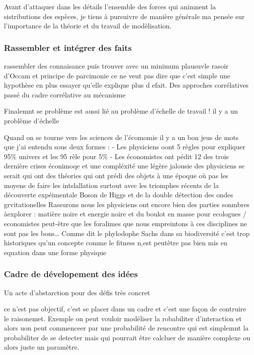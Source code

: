 Avant d'attaquer dans les détails l'ensemble des forces qui animnent la
sistributions des espèces, je tiens à pursuivre de manière générale ma
pensée sur l'importance de la théorie et du travail de modèlisation.

\subsubsection*{Rassembler et intégrer des
faits}\label{rassembler-et-intuxe9grer-des-faits}

rassembler des connaisance puis trouver avec un minimum plausuvle rasoir
d'Occam et principe de parcimonie ce ne veut pas dire que c'est simple
une hypothèse en plus essayer qu'elle explique plus d efait. Des
approches corrélatives passé du cadre corrélative au mécanisme

Finalemnt se problème est aussi lié au problème d'échelle de travail !
il y a un problème d'échelle

Quand on se tourne vers les sciences de l'écomomie il y a un bon jeus de
mots que j'ai entendu sous deux formes : - Les physiciens oont 5 règles
pour expliquer 95\% univers et les 95 rèle pour 5\% - Les économistes
ont pédit 12 des trois dernière crises éconimoqe et une compléxité une
légère jalousie des physiciens se serait qui ont des théories qui ont
prédi des objets à une époque où pas les moyens de faire les
intslallation surtout avec les triomphes récents de la découverte
expéimentale Boson de Higgs et de la double détection des ondes
grvitationelles Rassurons nous les physiciens ont encore bien des
parties sonmbres àexplorer : matière noire et energie noire et du boulot
en masse pour ecologues / economistes peut-être que les foralimes que
nous empreintons à ces disciplines ne sont pas les bons\ldots{} Comme
dit le phylodophe Sachs dans sa biodiversité c'est trop historiques
qu'un concepte comme le fitness n,est peutêtre pas bien mis en equation
dans une forme physique

\subsubsection*{Cadre de dévelopement des
idées}\label{cadre-de-duxe9velopement-des-iduxe9es}

Un acte d'abstarction pour des défis très concret

ce n'est pas objectif, c'est se placer dans un cadre et c'est une façon
de contruire le raisonemet. Exemple on peut vouloir modéliser la
robabiliter d'interaction et alors uon peut commenceer par une
probabilité de rencontre qui est simplemnt la probabiliter de se
detecter mais qui pourrait être calcluer de manière complexe ou alors
juste un paramètre.


